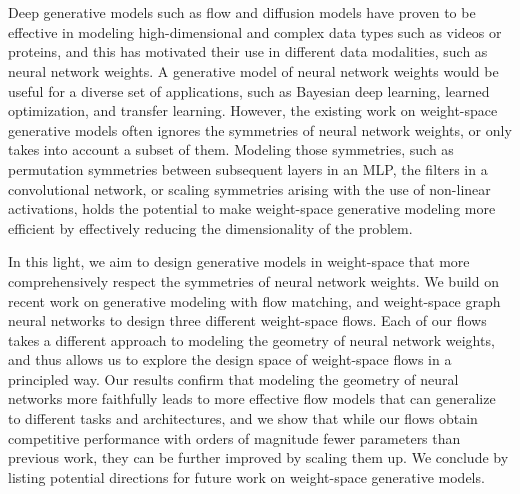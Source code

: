 \chapter{\abstractname}

Deep generative models such as flow and diffusion models have proven to be effective in modeling high-dimensional and complex data types such as videos or proteins, and this has motivated their use in different data modalities, such as neural network weights. A generative model of neural network weights would be useful for a diverse set of applications, such as Bayesian deep learning, learned optimization, and transfer learning. However, the existing work on weight-space generative models often ignores the symmetries of neural network weights, or only takes into account a subset of them. Modeling those symmetries, such as permutation symmetries between subsequent layers in an MLP, the filters in a convolutional network, or scaling symmetries arising with the use of non-linear activations, holds the potential to make weight-space generative modeling more efficient by effectively reducing the dimensionality of the problem. 

In this light, we aim to design generative models in weight-space that more comprehensively respect the symmetries of neural network weights. We build on recent work on generative modeling with flow matching, and weight-space graph neural networks to design three different weight-space flows. Each of our flows takes a different approach to modeling the geometry of neural network weights, and thus allows us to explore the design space of weight-space flows in a principled way. Our results confirm that modeling the geometry of neural networks more faithfully leads to more effective flow models that can generalize to different tasks and architectures, and we show that while our flows obtain competitive performance with orders of magnitude fewer parameters than previous work, they can be further improved by scaling them up. We conclude by listing potential directions for future work on weight-space generative models.